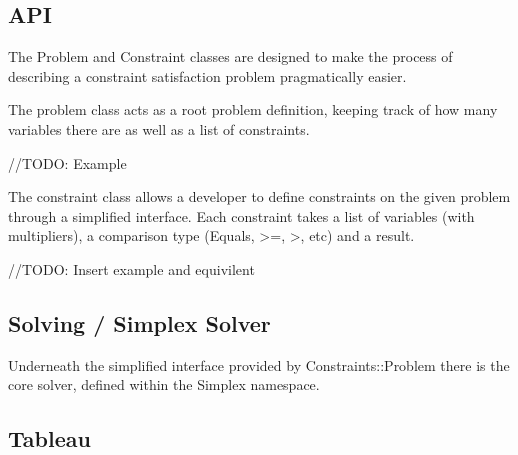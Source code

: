\documentclass{report}
\begin{document}

\subsection {API}
The Problem and Constraint classes are designed to make the process of describing a constraint satisfaction problem pragmatically easier.

The problem class acts as a root problem definition, keeping track of how many variables there are as well as a list of constraints.

//TODO: Example

The constraint class allows a developer to define constraints on the given problem through a simplified interface. Each constraint takes a list of variables (with multipliers), a comparison type (Equals, >=, >, etc) and a result.

//TODO: Insert example and equivilent

\subsection {Solving / Simplex Solver}

Underneath the simplified interface provided by Constraints::Problem there is the core solver, defined within the Simplex namespace.

\subsection {Tableau}
\end{document}
